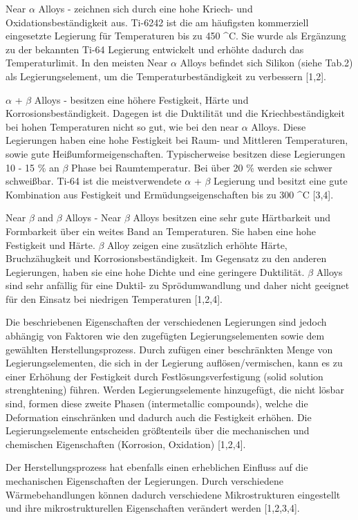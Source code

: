 Near $\alpha$ Alloys - zeichnen sich durch eine hohe Kriech- und Oxidationsbeständigkeit aus. Ti-6242 ist die am häufigsten kommerziell eingesetzte Legierung für Temperaturen bis zu 450 ^\circ C.
Sie wurde als Ergänzung zu der bekannten Ti-64 Legierung entwickelt und erhöhte dadurch das Temperaturlimit. In den meisten Near $\alpha$ Alloys befindet sich Silikon (siehe Tab.2) als Legierungselement, um die Temperaturbeständigkeit zu verbessern [1,2].

$\alpha$ + $\beta$ Alloys - besitzen eine höhere Festigkeit, Härte und Korrosionsbeständigkeit. Dagegen ist die Duktilität und die Kriechbeständigkeit bei hohen Temperaturen nicht so gut, wie bei den near $\alpha$ Alloys. Diese Legierungen haben eine hohe Festigkeit bei Raum- und Mittleren Temperaturen, sowie gute Heißumformeigenschaften. Typischerweise besitzen diese Legierungen 10 - 15 \% an $\beta$ Phase bei Raumtemperatur. Bei über 20 \% werden sie schwer schweißbar. Ti-64 ist die meistverwendete $\alpha$ + $\beta$ Legierung und besitzt eine gute Kombination aus Festigkeit und Ermüdungseigenschaften bis zu 300 ^\circ C [3,4].

Near $\beta$ and $\beta$ Alloys - Near $\beta$ Alloys besitzen eine sehr gute Härtbarkeit und Formbarkeit über ein weites Band an Temperaturen. Sie haben eine hohe Festigkeit und Härte.
$\beta$ Alloy zeigen eine zusätzlich erhöhte Härte, Bruchzähugkeit und Korrosionsbeständigkeit.
Im Gegensatz zu den anderen Legierungen, haben sie eine hohe Dichte und eine geringere Duktilität. $\beta$ Alloys sind sehr anfällig für eine Duktil- zu Sprödumwandlung und daher nicht geeignet für den Einsatz bei niedrigen Temperaturen [1,2,4].

Die beschriebenen Eigenschaften der verschiedenen Legierungen sind jedoch abhängig von Faktoren wie den zugefügten Legierungselementen sowie dem gewählten Herstellungsprozess.
Durch zufügen einer beschränkten Menge von Legierungselementen, die sich in der Legierung auflösen/vermischen, kann es zu einer Erhöhung der Festigkeit durch Festlösungsverfestigung (solid solution strenghtening) führen. Werden Legierungselemente hinzugefügt, die nicht lösbar sind, formen diese zweite Phasen (intermetallic compounds), welche die Deformation einschränken und dadurch auch die Festigkeit erhöhen. Die Legierungselemente entscheiden größtenteils über die mechanischen und chemischen Eigenschaften (Korrosion, Oxidation) [1,2,4].

Der Herstellungsprozess hat ebenfalls einen erheblichen Einfluss auf die mechanischen Eigenschaften der Legierungen. Durch verschiedene Wärmebehandlungen können dadurch verschiedene Mikrostrukturen eingestellt und ihre mikrostrukturellen Eigenschaften verändert werden [1,2,3,4].

